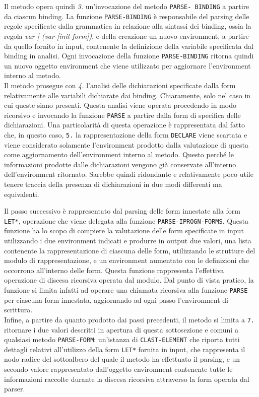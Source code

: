 Il metodo opera quindi \textit{3.} un’invocazione del metodo \texttt {PARSE-
BINDING} a partire da ciascun binding. La funzione \texttt {PARSE-BINDING} è
responsabile del parsing delle regole specificate dalla grammatica in relazione
alla sintassi dei binding, ossia la regola \textit {var | (var [init-form])}, e
della creazione un nuovo environment, a partire da quello fornito in input,
contenente la definizione della variabile specificata dal binding in analisi.
Ogni invocazione della funzione \texttt{PARSE-BINDING} ritorna quindi un nuovo
oggetto environment che viene utilizzato per aggiornare l’environment interno al
metodo.\\

Il metodo prosegue con \textit{4.} l’analisi delle dichiarazioni specificate
dalla form relativamente alle variabili dichiarate dai binding. Chiaramente,
solo nel caso in cui queste siano presenti. Questa analisi viene operata
procedendo in modo ricorsivo e invocando la funzione \texttt{PARSE} a partire
dalla form di specifica delle dichiarazioni. Una particolarità di questa
operazione è rappresentata dal fatto che, in questo caso, \texttt{5.} la
rappresentazione della form \texttt{DECLARE} viene scartata e viene considerato
solamente l'environment prodotto dalla valutazione di questa come aggiornamento
dell'environment interno al metodo. Questo perché le informazioni prodotte dalle
dichiarazioni vengono già conservate all'interno dell'environment ritornato.
Sarebbe quindi ridondante e relativamente poco utile tenere traccia della
presenza di dichiarazioni in due modi differenti ma equivalenti.

Il passo successivo è rappresentato dal parsing delle form innestate alla form
\texttt{LET*}, operazione che viene delegata alla funzione
\texttt{PARSE-IPROGN-FORMS}. Questa funzione ha lo scopo di compiere la
valutazione delle form specificate in input utilizzando i due environment
indicati e produrre in output due valori, una lista contenente la
rappresentazione di ciascuna delle form, utilizzando le strutture del modulo di
rappresentazione, e un environment aumentato con le definizioni che occorrono
all’interno delle form. Questa funzione rappresenta l'effettiva operazione di
discesa ricorsiva operata dal modulo. Dal punto di vista pratico, la funzione si
limita infatti ad operare una chiamata ricorsiva alla funzione \texttt{PARSE}
per ciascuna form innestata, aggiornando ad ogni passo l'environment di
scrittura.\\

Infine, a partire da quanto prodotto dai passi precedenti, il metodo si limita
a \texttt{7.} ritornare i due valori descritti in apertura di questa
sottosezione e comuni a qualsiasi metodo \texttt{PARSE-FORM}: un'istanza di
\texttt{CLAST-ELEMENT} che riporta tutti dettagli relativi all'utilizzo della
form \texttt{LET*} fornita in input, che rappresenta il nodo radice del
sottoalbero del quale il metodo ha effettuato il parsing, e un secondo valore
rappresentato dall'oggetto environment contenente tutte le informazioni
raccolte durante la discesa ricorsiva attraverso la form operata dal parser.\\

